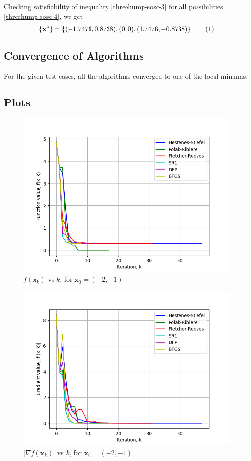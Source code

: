 \documentclass[a4paper]{article}
\newcommand\numberthis{\addtocounter{equation}{1}\tag{\theequation}}
\begin{document}
Checking satisfiability of inequality \eqref{threehump-sosc-3} for all possibilities \eqref{threehump-sosc-4}, we get
\begin{align*}
\left\{\textbf{x}^*\right\} = \left\{(-1.7476, 0.8738), (0, 0), (1.7476, -0.8738)\right\} \numberthis \label{threehump-minima}
\end{align*}

\subsection{Convergence of Algorithms}

For the given test cases, all the algorithms converged to one of the local minimas.

\subsection{Plots}

\begin{figure}[H]
    \centering
    \includegraphics[width=.65\textwidth]{three_hump_camel_function_vals.png}
    \caption{$f(\textbf{x}_k)$ vs $k$, for $\textbf{x}_0 = (-2, -1)$}
\end{figure}

\begin{figure}[H]
    \centering
    \includegraphics[width=.65\textwidth]{three_hump_camel_function_grad.png}
    \caption{$|\nabla f(\textbf{x}_k)|$ vs $k$, for $\textbf{x}_0 = (-2, -1)$}
\end{figure}
\end{document}
